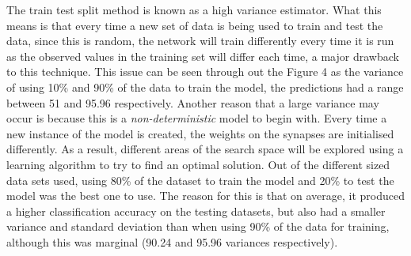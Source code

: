 \documentclass[11pt]{article}
\begin{document}
The train test split method is known as a high variance estimator. What this means is that every time a new set of data is being used to train and test the data, since this is random, the network will train differently every time it is run as the observed values in the training set will differ each time, a major drawback to this technique. This issue can be seen through out the Figure 4 as the variance of using 10\% and  90\% of the data to train the model, the predictions had a range between 51 and 95.96 respectively.  Another reason that a large variance may occur is because this is a \textit{non-deterministic} model to begin with. Every time a new instance of the model is created, the weights on the synapses are initialised differently. As a result, different areas of the search space will be explored using a learning algorithm to try to find an optimal solution. Out of the different sized data sets used, using 80\% of the dataset to train the model and 20\% to test the model was the best one to use. The reason for this is that on average, it produced a higher classification accuracy on the testing datasets, but also had a smaller variance and standard deviation than when using 90\% of the data for training, although this was marginal (90.24 and 95.96 variances respectively).   
\end{document}
